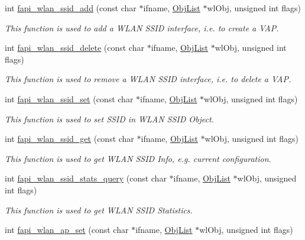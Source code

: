 \begin{DoxyCompactItemize}
int \hyperlink{group__FAPI__WLAN_ga285d3ee0b4f12bb44c1d7127bdc159eb}{fapi\-\_\-wlan\-\_\-ssid\-\_\-add} (const char $\ast$ifname, \hyperlink{structObjList}{Obj\-List} $\ast$wl\-Obj, unsigned int flags)
\begin{DoxyCompactList}\small\item\em This function is used to add a W\-L\-A\-N S\-S\-I\-D interface, i.\-e. to create a V\-A\-P. \end{DoxyCompactList}\item 
int \hyperlink{group__FAPI__WLAN_ga3a1b612200afcf5abe9804e167be8c72}{fapi\-\_\-wlan\-\_\-ssid\-\_\-delete} (const char $\ast$ifname, \hyperlink{structObjList}{Obj\-List} $\ast$wl\-Obj, unsigned int flags)
\begin{DoxyCompactList}\small\item\em This function is used to remove a W\-L\-A\-N S\-S\-I\-D interface, i.\-e. to delete a V\-A\-P. \end{DoxyCompactList}\item 
int \hyperlink{group__FAPI__WLAN_gab32b1a20637c03208b388cf168acaaf3}{fapi\-\_\-wlan\-\_\-ssid\-\_\-set} (const char $\ast$ifname, \hyperlink{structObjList}{Obj\-List} $\ast$wl\-Obj, unsigned int flags)
\begin{DoxyCompactList}\small\item\em This function is used to set S\-S\-I\-D in W\-L\-A\-N S\-S\-I\-D Object. \end{DoxyCompactList}\item 
int \hyperlink{group__FAPI__WLAN_ga916dc0623060162bf1c0cb86987e96e9}{fapi\-\_\-wlan\-\_\-ssid\-\_\-get} (const char $\ast$ifname, \hyperlink{structObjList}{Obj\-List} $\ast$wl\-Obj, unsigned int flags)
\begin{DoxyCompactList}\small\item\em This function is used to get W\-L\-A\-N S\-S\-I\-D Info, e.\-g. current configuration. \end{DoxyCompactList}\item 
int \hyperlink{group__FAPI__WLAN_ga420d1a426ee18fdf2a735b374e3a7232}{fapi\-\_\-wlan\-\_\-ssid\-\_\-stats\-\_\-query} (const char $\ast$ifname, \hyperlink{structObjList}{Obj\-List} $\ast$wl\-Obj, unsigned int flags)
\begin{DoxyCompactList}\small\item\em This function is used to get W\-L\-A\-N S\-S\-I\-D Statistics. \end{DoxyCompactList}\item 
int \hyperlink{group__FAPI__WLAN_gadbab570d483aff2bdfb08dda0909ea26}{fapi\-\_\-wlan\-\_\-ap\-\_\-set} (const char $\ast$ifname, \hyperlink{structObjList}{Obj\-List} $\ast$wl\-Obj, unsigned int flags)

\end{DoxyCompactItemize}
